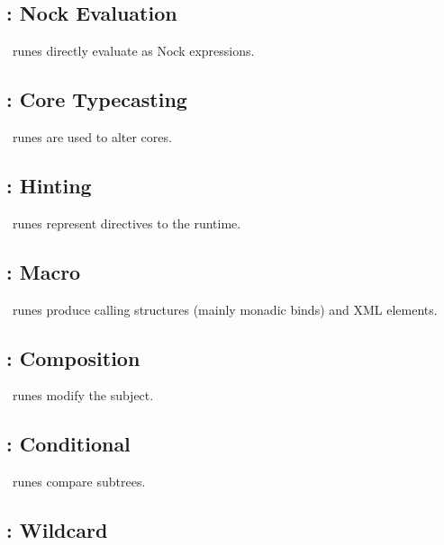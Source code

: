 \subsection{\pdot:  Nock Evaluation}

\pdot~runes directly evaluate as Nock expressions.

\subsection{\pket:  Core Typecasting}

\pket~runes are used to alter cores.

\subsection{\psig:  Hinting}

\psig~runes represent directives to the runtime.

\subsection{\pmic:  Macro}

\mic~runes produce calling structures (mainly monadic binds) and XML elements.

\subsection{\ptis:  Composition}

\tis~runes modify the subject.

\subsection{\pwut:  Conditional}

\wut~runes compare subtrees.

\subsection{\pzap:  Wildcard}

